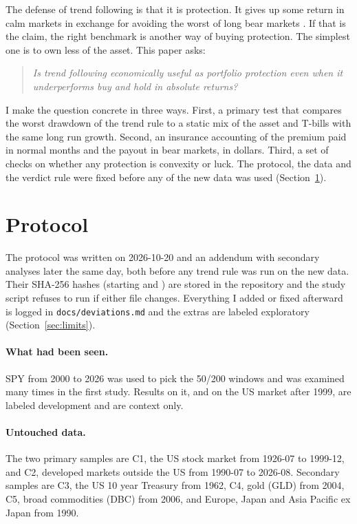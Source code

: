 \documentclass[11pt]{article}
\begin{document}
The defense of trend following is that it is protection. It gives up some return in calm markets in exchange for avoiding the worst of long bear markets \citep{hurst}. If that is the claim, the right benchmark is another way of buying protection. The simplest one is to own less of the asset. This paper asks:

\begin{quote}
\emph{Is trend following economically useful as portfolio protection even when it underperforms buy and hold in absolute returns?}
\end{quote}

I make the question concrete in three ways. First, a primary test that compares the worst drawdown of the trend rule to a static mix of the asset and T-bills with the same long run growth. Second, an insurance accounting of the premium paid in normal months and the payout in bear markets, in dollars. Third, a set of checks on whether any protection is convexity or luck. The protocol, the data and the verdict rule were fixed before any of the new data was used (Section~\ref{sec:protocol}).

\section{Protocol}\label{sec:protocol}

The protocol was written on 2026-10-20 and an addendum with secondary analyses later the same day, both before any trend rule was run on the new data. Their SHA-256 hashes (starting \texttt{} and \texttt{}) are stored in the repository and the study script refuses to run if either file changes. Everything I added or fixed afterward is logged in \texttt{docs/deviations.md} and the extras are labeled exploratory (Section~\ref{sec:limits}).

\paragraph{What had been seen.} SPY from 2000 to 2026 was used to pick the 50/200 windows and was examined many times in the first study. Results on it, and on the US market after 1999, are labeled development and are context only.

\paragraph{Untouched data.} The two primary samples are C1, the US stock market from 1926-07 to 1999-12, and C2, developed markets outside the US from 1990-07 to 2026-08. Secondary samples are C3, the US 10 year Treasury from 1962, C4, gold (GLD) from 2004, C5, broad commodities (DBC) from 2006, and Europe, Japan and Asia Pacific ex Japan from 1990.
\end{document}
